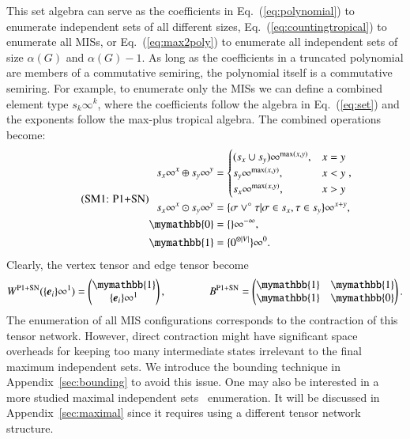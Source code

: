\documentclass[onefignum, onetabnum]{siamart190516}
\newcommand{\eqname}[1]{\stepcounter{equation}\tag{\theequation : #1}}
\newcommand{\<}{\langle}
\renewcommand{\>}{\rangle}
\newcommand{\Eq}[1]{Eq.~(\ref{#1})}
\newcommand{\App}[1]{Appendix~\ref{#1}}
\newcounter{example}
\begin{document}
This set algebra can serve as the coefficients in \Eq{eq:polynomial} to enumerate independent sets of all different sizes, \Eq{eq:countingtropical} to enumerate all MISs, or \Eq{eq:max2poly} to enumerate all independent sets of size $\alpha(G)$ and $\alpha(G)-1$.
As long as the coefficients in a truncated polynomial are members of a commutative semiring, the polynomial itself is a commutative semiring.
For example, to enumerate only the MISs we can define a combined element type $s_{k}\infty^k$, where the coefficients follow the algebra in \Eq{eq:set} and the exponents follow the max-plus tropical algebra.
The combined operations become: 
\begin{equation}
\eqname{P1+SN}
\begin{split}
    s_x\infty^x \oplus s_y\infty^y &= \begin{cases}
        (s_x \cup s_y)\infty^{\max(x,y)}, & x = y\\
        s_y\infty^{\max(x,y)}, & x < y\\
        s_x\infty^{\max(x,y)}, & x > y
    \end{cases},\\
    s_x\infty^x \odot s_y\infty^y &= \{\sigma \lor^\circ \tau | \sigma \in s_x, \tau \in s_y\}\infty^{x+y},\\
    \mymathbb{0} &= \{\}\infty^{-\infty},\\
    \mymathbb{1} &= \{0^{\otimes |V|}\}\infty^{0}. \label{eq:countingtropicalset}
\end{split}
\end{equation}
Clearly, the vertex tensor and edge tensor become
\begin{equation}
    W^{\rm P1+SN}(\{\boldsymbol{e}_{i}\}\infty^1) = \left(\begin{matrix}
        \mymathbb{1} \\
        \{\boldsymbol{e}_{i}\}\infty^1
    \end{matrix}\right),   
    \qquad \qquad
        B^{\rm P1+SN} = \left(\begin{matrix}
        \mymathbb{1}  & \mymathbb{1} \\
        \mymathbb{1} & \mymathbb{0}
    \end{matrix}\right).
\end{equation}
The enumeration of all MIS configurations corresponds to the contraction of this tensor network.
However, direct contraction might have significant space overheads for keeping too many intermediate states irrelevant to the final maximum independent sets.
We introduce the bounding technique in \App{sec:bounding} to avoid this issue.
One may also be interested in a more studied maximal independent sets~\cite{Bron1973, Eppstein2010, Johnson1988} enumeration.
It will be discussed in \App{sec:maximal} since it requires using a different tensor network structure.
\end{document}

